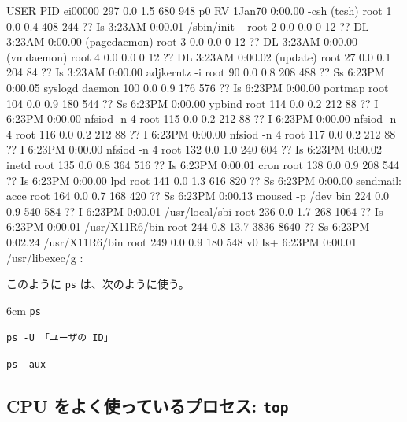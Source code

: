 \begin{progls}
USER       PID %
ei00000    297  0.0  1.5   680  948  p0  RV    1Jan70    0:00.00 -csh (tcsh)
root         1  0.0  0.4   408  244  ??  Is    3:23AM    0:00.01 /sbin/init --
root         2  0.0  0.0     0   12  ??  DL    3:23AM    0:00.00  (pagedaemon)
root         3  0.0  0.0     0   12  ??  DL    3:23AM    0:00.00  (vmdaemon)
root         4  0.0  0.0     0   12  ??  DL    3:23AM    0:00.02  (update)
root        27  0.0  0.1   204   84  ??  Is    3:23AM    0:00.00 adjkerntz -i
root        90  0.0  0.8   208  488  ??  Ss    6:23PM    0:00.05 syslogd
daemon     100  0.0  0.9   176  576  ??  Is    6:23PM    0:00.00 portmap
root       104  0.0  0.9   180  544  ??  Ss    6:23PM    0:00.00 ypbind
root       114  0.0  0.2   212   88  ??  I     6:23PM    0:00.00 nfsiod -n 4
root       115  0.0  0.2   212   88  ??  I     6:23PM    0:00.00 nfsiod -n 4
root       116  0.0  0.2   212   88  ??  I     6:23PM    0:00.00 nfsiod -n 4
root       117  0.0  0.2   212   88  ??  I     6:23PM    0:00.00 nfsiod -n 4
root       132  0.0  1.0   240  604  ??  Is    6:23PM    0:00.02 inetd
root       135  0.0  0.8   364  516  ??  Is    6:23PM    0:00.01 cron
root       138  0.0  0.9   208  544  ??  Is    6:23PM    0:00.00 lpd
root       141  0.0  1.3   616  820  ??  Ss    6:23PM    0:00.00 sendmail: acce
root       164  0.0  0.7   168  420  ??  Ss    6:23PM    0:00.13 moused -p /dev
bin        224  0.0  0.9   540  584  ??  I     6:23PM    0:00.01 /usr/local/sbi
root       236  0.0  1.7   268 1064  ??  Is    6:23PM    0:00.01 /usr/X11R6/bin
root       244  0.8 13.7  3836 8640  ??  Ss    6:23PM    0:02.24 /usr/X11R6/bin
root       249  0.0  0.9   180  548  v0  Is+   6:23PM    0:00.01 /usr/libexec/g
:\blsq
\end{progls}


このように \texttt{ps} は、次のように使う。
\begin{coml}{6cm}
\texttt{ps}

\smallskip
\texttt{ps -U 「ユーザの ID」}

\smallskip
\texttt{ps -aux}
\end{coml}

\newpage

\subsection{CPU をよく使っているプロセス: \texttt{top}}

